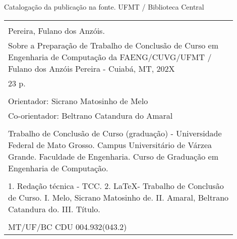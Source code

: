 %
%

\newpage

\begin{center}

\vspace*{\fill}

Catalogação da publicação na fonte.
UFMT / Biblioteca Central

\vspace{2ex}

\begin{tabular}{|p{0.9\linewidth}|} \hline
\\
Pereira, Fulano dos Anzóis.\\
\hspace{1em} Sobre a Preparação de Trabalho de Conclusão de Curso em Engenharia de Computação da FAENG/CUVG/UFMT /
Fulano dos Anzóis Pereira - Cuiabá, MT, 202X \\
\hspace{1em} 23 p. \\
\\
\hspace{1em} Orientador: Sicrano Matosinho de Melo \\
\hspace{1em} Co-orientador: Beltrano Catandura do Amaral \\
\\
\hspace{1em} Trabalho de Conclusão de Curso (graduação) - Universidade Federal de Mato Grosso.
Campus Universitário de Várzea Grande. Faculdade de Engenharia. Curso de Graduação em Engenharia de Computação. \\
\\
\hspace{1em} 1. Redação técnica - TCC. 2. \LaTeX - Trabalho de Conclusão de Curso.
I. Melo, Sicrano Matosinho de. II. Amaral, Beltrano Catandura do.
III. Título. \\
\\
MT/UF/BC \hfill CDU 004.932(043.2) \\ \hline
\end{tabular} 

\end{center}
